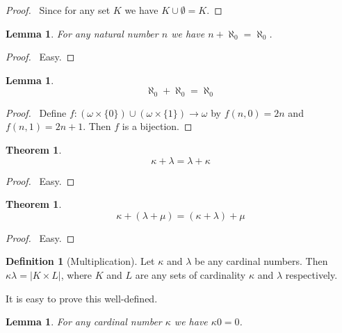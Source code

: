 \documentclass{report}
\let\qed\relax
\newtheorem{lemma}[axiom]{Lemma}
\newtheorem{theorem}[axiom]{Theorem}
\theoremstyle{definition}
\newtheorem{definition}[axiom]{Definition}
\begin{document}
    \begin{proof}
        \pf\ Since for any set $K$ we have $K \cup \emptyset = K$.
    \end{proof}

    \begin{lemma}
        For any natural number $n$ we have $n + \aleph_0 = \aleph_0$.
    \end{lemma}

    \begin{proof}
        \pf\ Easy. \qed
    \end{proof}

    \begin{lemma}
        \label{lemma:aleph0_plus_aleph0}
        \[ \aleph_0 + \aleph_0 = \aleph_0 \]
    \end{lemma}

    \begin{proof}
        \pf\ Define $f : (\omega \times \{ 0 \}) \cup (\omega \times \{1\}) \rightarrow \omega$ by
        $f(n,0) = 2n$ and $f(n,1) = 2n+1$. Then $f$ is a bijection. \qed
    \end{proof}

    \begin{theorem}
        \[ \kappa + \lambda = \lambda + \kappa \]
    \end{theorem}

    \begin{proof}
        \pf\ Easy. \qed
    \end{proof}

    \begin{theorem}
        \[ \kappa + (\lambda + \mu) = (\kappa + \lambda) + \mu \]
    \end{theorem}

    \begin{proof}
        \pf\ Easy. \qed
    \end{proof}

    \begin{definition}[Multiplication]
        Let $\kappa$ and $\lambda$ be any cardinal numbers. Then $\kappa \lambda = |K \times L|$,
        where $K$ and $L$ are any sets of cardinality $\kappa$ and $\lambda$ respectively.
    \end{definition}

    It is easy to prove this well-defined.

    \begin{lemma}
        For any cardinal number $\kappa$ we have $\kappa 0 = 0$.
    \end{lemma}
\end{document}
